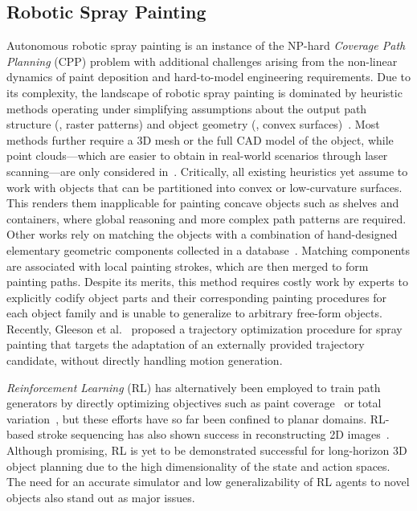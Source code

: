 


\subsection{Robotic Spray Painting}
\label{sec:painting}
Autonomous robotic spray painting is an instance of the NP-hard \emph{Coverage Path Planning} (CPP) problem with additional challenges arising from the non-linear dynamics of paint deposition and hard-to-model engineering requirements. 
Due to its complexity, the landscape of robotic spray painting is dominated by heuristic methods operating under simplifying assumptions about the output path structure (\eg, raster patterns) and object geometry (\eg, convex surfaces)~\cite{Sheng_Automated_2000,Chen_Automated_2008,Li_Automatic_2010,Andulkar_Incremental_2015,atkar24uniform,Chen_Trajectory_2020,gleeson2022generating}.
Most methods further require a 3D mesh or the full CAD model of the object, while point clouds---which are easier to obtain in real-world scenarios through laser scanning---are only considered in~\cite{Chen_Trajectory_2020}.
% 
Critically, all existing heuristics yet assume to work with objects that can be partitioned into convex or low-curvature surfaces. This renders them inapplicable for painting concave objects such as shelves and containers, where global reasoning and more complex path patterns are required. 
%
Other works rely on matching the objects with a combination of hand-designed elementary geometric components collected in a database~\cite{Biegelbauer_Inverse_2005}.
Matching components are associated with local painting strokes, which are then merged to form painting paths.
Despite its merits, this method requires costly work by experts to explicitly codify object parts and their corresponding painting procedures for each object family and is unable to generalize to arbitrary free-form objects.
%
Recently, Gleeson et al.~\cite{gleeson2022generating} proposed a trajectory optimization procedure for spray painting that targets the adaptation of an externally provided trajectory candidate, without directly handling motion generation. 

\emph{Reinforcement Learning} (RL) has alternatively been employed to train path generators by directly optimizing objectives such as paint coverage~\cite{Kiemel_PaintRL_2019} or total variation~\cite{jonnarth2024learningcoverageicml}, but these efforts have so far been confined to planar domains.
RL-based stroke sequencing has also shown success in reconstructing 2D images~\cite{Huang_Learning_2019}. Although promising, RL is yet to be demonstrated successful for long-horizon 3D object planning due to the high dimensionality of the state and action spaces. The need for an accurate simulator and low generalizability of RL agents to novel objects also stand out as major issues.

